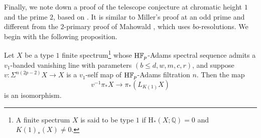 Finally, we note down a proof of the telescope conjecture at chromatic height $1$ and the prime $2$, based on . It is similar to Miller's proof at an odd prime \cite{Miller} and different from the $2$-primary proof of Mahowald \cite{MahJEHP}, which uses $bo$-resolutions. We begin with the following proposition.

\begin{prop}\label{prop:v1-band-tele}
    Let $X$ be a type $1$ finite spectrum\footnote{A finite spectrum $X$ is said to be type $1$ if $\mathrm{H}_* (X;\mathbb{Q}) = 0$ and $K(1)_* (X) \neq 0$.} whose $\mathrm{H}\mathbb{F}_p$-Adams spectral sequence admits a $v_1$-banded vanishing line with parameters $(b \leq d, w, m, c, r)$, and suppose $v : \Sigma^{n(2p-2)} X \to X$ is a $v_1$-self map of $\mathrm{H}\mathbb{F}_p$-Adams filtration $n$. Then the map \[v^{-1} \pi_{*} X \to \pi_* (L_{K(1)} X) \] is an isomorphism.
\end{prop}

